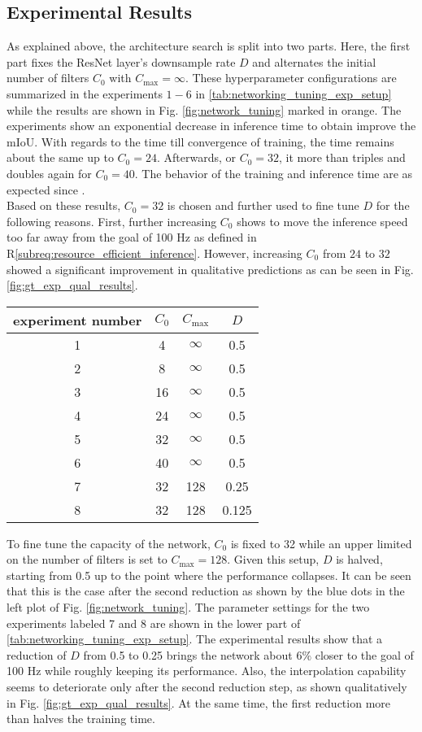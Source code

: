 \subsection{Experimental Results}
\label{subsec:exp_results_unet_arch}
As explained above, the architecture search is split into two parts. Here, the first part fixes the ResNet layer's downsample rate $D$ and alternates the initial number of filters $C_0$ with $C_{\max} = \infty$. These hyperparameter configurations are summarized in the experiments $1-6$ in \ref{tab:networking_tuning_exp_setup} while the results are shown in Fig. \ref{fig:network_tuning} marked in orange. The experiments show an exponential decrease in inference time to obtain improve the mIoU. With regards to the time till convergence of training, the time remains about the same up to $C_0 = 24$. Afterwards, or $C_0 = 32$, it more than triples and doubles again for $C_0 = 40$. The behavior of the training and inference time are as expected since .\\
Based on these results, $C_0 = 32$ is chosen and further used to fine tune $D$ for the following reasons. First, further increasing $C_0$ shows to move the inference speed too far away from the goal of 100 Hz as defined in R\ref{subreq:resource_efficient_inference}. However, increasing $C_0$ from $24$ to $32$ showed a significant improvement in qualitative predictions as can be seen in Fig. \ref{fig:gt_exp_qual_results}.
\begin{center}
\begin{tabular}{c|c|c|c}
	experiment number & $C_0$ & $C_{\max}$ & $D$ \\
	\hline
	1 & 4 & $\infty$ & 0.5 \\
	2 & 8 & $\infty$ & 0.5 \\
	3 & 16 & $\infty$ & 0.5 \\
	4 & 24 & $\infty$ & 0.5 \\
	5 & 32 & $\infty$ & 0.5 \\
	6 & 40 & $\infty$ & 0.5 \\
	\hline
	7 & 32 & 128 & 0.25 \\
	8 & 32 & 128 & 0.125
\end{tabular}
\end{center}
To fine tune the capacity of the network, $C_0$ is fixed to 32 while an upper limited on the number of filters is set to $C_{\max}=128$. Given this setup, $D$ is halved, starting from 0.5 up to the point where the performance collapses. It can be seen that this is the case after the second reduction as shown by the blue dots in the left plot of Fig. \ref{fig:network_tuning}. The parameter settings for the two experiments labeled 7 and 8 are shown in the lower part of \ref{tab:networking_tuning_exp_setup}. The experimental results show that a reduction of $D$ from 0.5 to 0.25 brings the network about $6\%$ closer to the goal of 100 Hz while roughly keeping its performance. Also, the interpolation capability seems to deteriorate only after the second reduction step, as shown qualitatively in Fig. \ref{fig:gt_exp_qual_results}. At the same time, the first reduction more than halves the training time.  
